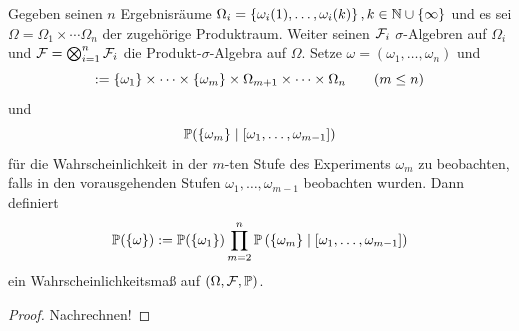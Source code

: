 \begin{satz} \label{satz: 3_1_6_stufenexperiment}
	Gegeben seinen $n$ Ergebnisräume $\Omega_i = \left\{ \omega_i (1), \dots, \omega_i (k) \right\}, k \in \mathbb{N} \cup \left\{ \infty \right\}$ und es sei $\Omega = \Omega_1 \times \cdots \Omega_n$ der zugehörige Produktraum. Weiter seinen $\mathcal{F}_i$ $\sigma$-Algebren auf $\Omega_i$ und $\mathcal{F} = \bigotimes_{i=1}^n \mathcal{F}_i$ die Produkt-$\sigma$-Algebra auf $\Omega$. Setze $\omega = (\omega_1,\dots,\omega_n)$ und
	\begin{equation*}
	[\omega_1,\dots,\omega_m] \defeq \menge{\omega_1}\times \dots \times \menge{\omega_m} \times \Omega_{m+1} \times \cdots \times \Omega_{n} \qquad (m \leq n) 
	\end{equation*}
	und
	\begin{equation*}
		\mathbb{P}(\left\{ \omega_m \right\} \mid [\omega_1,\dots,\omega_{m-1}])
	\end{equation*}
	für die Wahrscheinlichkeit in der $m$-ten Stufe des Experiments $\omega_m$ zu beobachten, falls in den vorausgehenden Stufen $\omega_1,\dots,\omega_{m-1}$ beobachten wurden. Dann definiert
	\begin{equation*}
		\mathbb{P}(\left\{ \omega \right\}) \mathrel{:=} \mathbb{P}(\left\{ \omega_1 \right\}) \prod_{m=2}^{n}\mathbb{P}\left( \left\{ \omega_m \right\} \mid [\omega_1, \dots, \omega_{m-1}] \right)
	\end{equation*}
	ein Wahrscheinlichkeitsmaß auf $(\Omega, \mathcal{F}, \mathbb{P})$.
\end{satz}
\begin{proof}
	Nachrechnen!
\end{proof}

